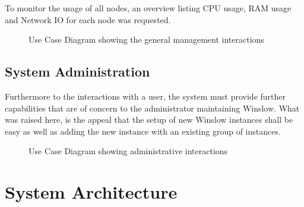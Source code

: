 To monitor the usage of all nodes, an overview listing CPU usage, RAM usage and Network IO for each node was requested.

\begin{figure}[H]
	\centering
	\caption{Use Case Diagram showing the general management interactions}
	\label{use_case:monitor}
\end{figure}


\pagebreak
\subsection{System Administration}

Furthermore to the interactions with a user, the system must provide further capabilities that are of concern to the administrator maintaining Winslow.
What was raised here, is the appeal that the setup of new Winslow instances shall be easy as well as adding the new instance with an existing group of instances.


\begin{figure}[H]
	\centering
	\caption{Use Case Diagram showing administrative interactions}
	\label{use_case:admin}
\end{figure}



\pagebreak
\section{System Architecture}

